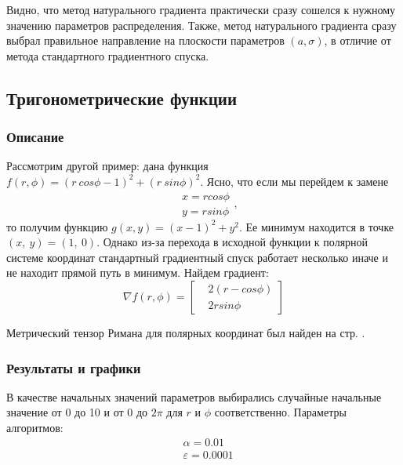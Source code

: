 \documentclass[a4paper,12pt]{article}
\begin{document}
        Видно, что метод натурального градиента практически сразу сошелся к нужному значению параметров распределения.
        Также, метод натурального градиента сразу выбрал правильное направление на плоскости параметров $(a, \sigma)$, 
        в отличие от метода стандартного градиентного спуска.

\newpage

\subsection{Тригонометрические функции}
\subsubsection{Описание}
        Рассмотрим другой пример: дана функция $f(r, \phi) = (r ~ cos \phi -1)^2 + (r ~ sin \phi)^2$.
        Ясно, что если мы перейдем к замене
        $$
            \begin{aligned}
                & x = r cos \phi \\
                & y = r sin \phi
            \end{aligned},
        $$
        то получим функцию $g(x, y) = (x - 1)^2 + y^2$. Ее минимум находится в точке $(x,~ y) = (1,~ 0)$. Однако из-за
        перехода в исходной функции к полярной системе координат стандартный градиентный спуск работает несколько иначе и не находит прямой путь в минимум.
        Найдем градиент:
        $$
            \nabla f(r, \phi) = 
            \left[
                \begin{aligned}
                    & 2(r - cos \phi) \\
                    & 2r sin \phi
                \end{aligned}
            \right]
        $$
        
        Метрический тензор Римана для полярных координат был найден на стр. \pageref{PolarTensor}.
        \newpage

\subsubsection{Результаты и графики}

        В качестве начальных значений параметров выбирались случайные начальные значение от 0 до 10 и от 0 до $2\pi$ для $r$ и $\phi$ соответственно.
        Параметры алгоритмов:
        $$
            \begin{aligned}
                & \alpha = 0.01 \\
                & \varepsilon = 0.0001
            \end{aligned}
        $$
\end{document}
